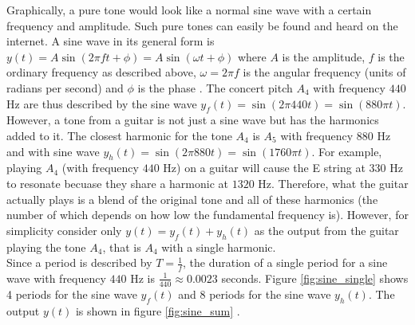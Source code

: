 Graphically, a pure tone would look like a normal sine wave with a certain frequency and amplitude. Such pure tones can easily be found and heard on the internet. A sine wave in its general form is $y(t) = A\sin(2\pi f t + \phi) = A\sin(\omega t + \phi)$ where $A$ is the amplitude, $f$ is the ordinary frequency as described above, $\omega = 2 \pi f$ is the angular frequency (units of radians per second) and $\phi$ is the phase \cite{SineWave}. The concert pitch $A_4$ with frequency $440$ Hz are thus described by the sine wave $y_f(t) = \sin(2 \pi 440 t) = \sin(880 \pi t)$. \\
However, a tone from a guitar is not just a sine wave but has the harmonics added to it. The closest harmonic for the tone $A_4$ is $A_5$ with frequency $880$ Hz and with sine wave $y_h(t) = \sin(2 \pi 880 t) = \sin(1760 \pi t)$. For example, playing $A_4$ (with frequency $440$ Hz) on a guitar will cause the E string at $330$ Hz to resonate becuase they share a harmonic at $1320$ Hz. Therefore, what the guitar actually plays is a blend of the original tone and all of these harmonics (the number of which depends on how low the fundamental frequency is). However, for simplicity consider only $y(t) = y_f(t) + y_h(t)$ as the output from the guitar playing the tone $A_4$, that is $A_4$ with a single harmonic. \\
Since a period is described by $T = \frac{1}{f}$, the duration of a single period for a sine wave with frequency $440$ Hz is $\frac{1}{440} \approx 0.0023$ seconds. Figure \ref{fig:sine_single} shows 4 periods for the sine wave $y_f(t)$ and 8 periods for the sine wave $y_h(t)$. The output $y(t)$ is shown in figure \ref{fig:sine_sum} \cite{harmonics}.

